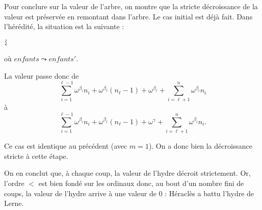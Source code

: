 \documentclass{../notes}
\begin{document}
\begin{enumerate}
      Pour conclure sur la valeur de l'arbre, on montre que la stricte décroissance de la valeur est préservée en remontant dans l'arbre.
      Le cas initial est déjà fait.
      Dans l'hérédité, la situation est la suivante :

      \begin{adjustbox}{center}
      \end{adjustbox}

      \begin{adjustbox}{center}
        {\LARGE $ \vertical\leadsto $}
      \end{adjustbox}

      \begin{adjustbox}{center}
      \end{adjustbox}
      
      où $\mathit{enfants} \leadsto \mathit{enfants}'$.

      La valeur passe donc de \[
        \sum_{i=1}^{\ell - 1} \omega^{\beta_i} n_i + 
        \omega^{\beta_\ell} (n_\ell - 1) +
        \omega^{\beta_\ell} +
        \sum_{i=\ell+1}^n \omega^{\beta_i} n_i
      \]
      à \[
        \sum_{i=1}^{\ell - 1} \omega^{\beta_i} n_i + 
        \omega^{\beta_\ell} (n_\ell - 1) +
        \omega^{\gamma} +
        \sum_{i=\ell+1}^n \omega^{\beta_i} n_i
      .\]

      Ce cas est identique au précédent (avec $m = 1$).
      On a donc bien la décroissance stricte à cette étape.

      On en conclut que, à chaque coup, la valeur de l'hydre décroit strictement.
      Or, l'ordre $<$ est bien fondé sur les ordinaux donc, au bout d'un nombre fini de coups, la valeur de l'hydre arrive à une valeur de $0$ : Héraclès a battu l'hydre de Lerne.
  \end{enumerate}
\end{document}
